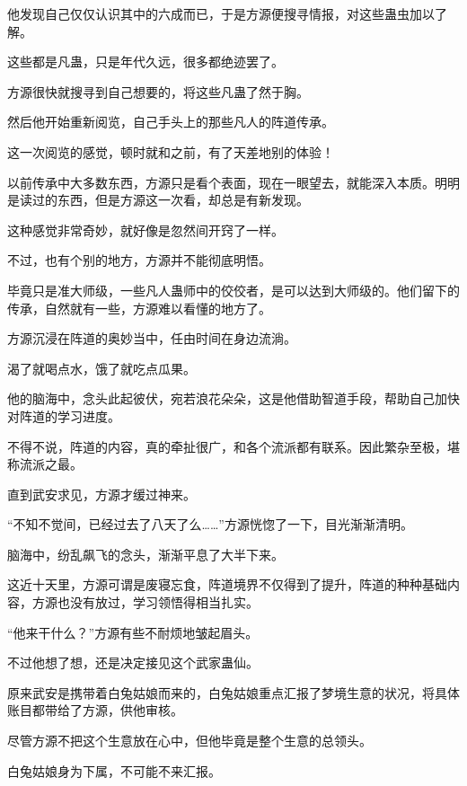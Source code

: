 \begin{this_body}
他发现自己仅仅认识其中的六成而已，于是方源便搜寻情报，对这些蛊虫加以了解。

这些都是凡蛊，只是年代久远，很多都绝迹罢了。

方源很快就搜寻到自己想要的，将这些凡蛊了然于胸。

然后他开始重新阅览，自己手头上的那些凡人的阵道传承。

这一次阅览的感觉，顿时就和之前，有了天差地别的体验！

以前传承中大多数东西，方源只是看个表面，现在一眼望去，就能深入本质。明明是读过的东西，但是方源这一次看，却总是有新发现。

这种感觉非常奇妙，就好像是忽然间开窍了一样。

不过，也有个别的地方，方源并不能彻底明悟。

毕竟只是准大师级，一些凡人蛊师中的佼佼者，是可以达到大师级的。他们留下的传承，自然就有一些，方源难以看懂的地方了。

方源沉浸在阵道的奥妙当中，任由时间在身边流淌。

渴了就喝点水，饿了就吃点瓜果。

他的脑海中，念头此起彼伏，宛若浪花朵朵，这是他借助智道手段，帮助自己加快对阵道的学习进度。

不得不说，阵道的内容，真的牵扯很广，和各个流派都有联系。因此繁杂至极，堪称流派之最。

直到武安求见，方源才缓过神来。

“不知不觉间，已经过去了八天了么……”方源恍惚了一下，目光渐渐清明。

脑海中，纷乱飙飞的念头，渐渐平息了大半下来。

这近十天里，方源可谓是废寝忘食，阵道境界不仅得到了提升，阵道的种种基础内容，方源也没有放过，学习领悟得相当扎实。

“他来干什么？”方源有些不耐烦地皱起眉头。

不过他想了想，还是决定接见这个武家蛊仙。

原来武安是携带着白兔姑娘而来的，白兔姑娘重点汇报了梦境生意的状况，将具体账目都带给了方源，供他审核。

尽管方源不把这个生意放在心中，但他毕竟是整个生意的总领头。

白兔姑娘身为下属，不可能不来汇报。

\end{this_body}

